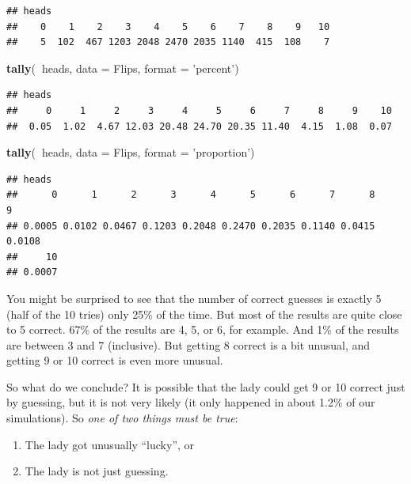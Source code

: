 \documentclass[]{book}
\newenvironment{Shaded}{\begin{snugshade}}{\end{snugshade}}
\newcommand{\DataTypeTok}[1]{\textcolor[rgb]{0.13,0.29,0.53}{#1}}
\newcommand{\KeywordTok}[1]{\textcolor[rgb]{0.13,0.29,0.53}{\textbf{#1}}}
\newcommand{\NormalTok}[1]{#1}
\newcommand{\OperatorTok}[1]{\textcolor[rgb]{0.81,0.36,0.00}{\textbf{#1}}}
\newcommand{\StringTok}[1]{\textcolor[rgb]{0.31,0.60,0.02}{#1}}
\providecommand{\tightlist}{%
  \setlength{\itemsep}{0pt}\setlength{\parskip}{0pt}}
\begin{document}
\begin{verbatim}
## heads
##    0    1    2    3    4    5    6    7    8    9   10 
##    5  102  467 1203 2048 2470 2035 1140  415  108    7
\end{verbatim}

\begin{Shaded}
\begin{Highlighting}[]
\KeywordTok{tally}\NormalTok{(}\OperatorTok{~}\NormalTok{heads, }\DataTypeTok{data =}\NormalTok{ Flips, }\DataTypeTok{format =} \StringTok{'percent'}\NormalTok{)}
\end{Highlighting}
\end{Shaded}

\begin{verbatim}
## heads
##     0     1     2     3     4     5     6     7     8     9    10 
##  0.05  1.02  4.67 12.03 20.48 24.70 20.35 11.40  4.15  1.08  0.07
\end{verbatim}

\begin{Shaded}
\begin{Highlighting}[]
\KeywordTok{tally}\NormalTok{(}\OperatorTok{~}\NormalTok{heads, }\DataTypeTok{data =}\NormalTok{ Flips, }\DataTypeTok{format =} \StringTok{'proportion'}\NormalTok{)}
\end{Highlighting}
\end{Shaded}

\begin{verbatim}
## heads
##      0      1      2      3      4      5      6      7      8      9 
## 0.0005 0.0102 0.0467 0.1203 0.2048 0.2470 0.2035 0.1140 0.0415 0.0108 
##     10 
## 0.0007
\end{verbatim}

You might be surprised to see that the number of correct guesses is exactly 5 (half of the 10 tries) only
25\%
of the time. But most of the results are quite close to 5 correct.
67\% of the results are
4, 5, or 6, for example.
And 1\% of the results are between 3 and 7 (inclusive). But getting 8 correct is a bit unusual, and getting 9 or 10 correct is even
more unusual.

So what do we conclude? It is possible that the lady could get 9 or 10 correct just by guessing, but it is not very likely (it only happened in about
1.2\% of our simulations).
So \emph{one of two things must be true}:

\begin{enumerate}
\tightlist
\item
  The lady got unusually ``lucky'', or
\item
  The lady is not just guessing.
\end{enumerate}
\end{document}
